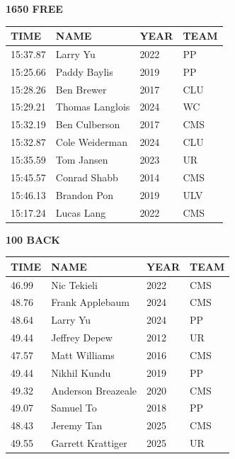 \begin{table}[H]
\centering
\begin{minipage}[t]{0.48\textwidth}
\centering
\textbf{1650 FREE}\\[0.1cm]
\begin{tabular}{@{}p{1.8cm}p{2.8cm}p{1.2cm}p{1.4cm}@{}}
\hline
    \textbf{TIME} & \textbf{NAME} & \textbf{YEAR} & \textbf{TEAM} \\
\hline
    15:37.87 & Larry Yu & 2022 & PP \\
    15:25.66 & Paddy Baylis & 2019 & PP \\
    15:28.26 & Ben Brewer & 2017 & CLU \\
    15:29.21 & Thomas Langlois & 2024 & WC \\
    15:32.19 & Ben Culberson & 2017 & CMS \\
    15:32.87 & Cole Weiderman & 2024 & CLU \\
    15:35.59 & Tom Jansen & 2023 & UR \\
    15:45.57 & Conrad Shabb & 2014 & CMS \\
    15:46.13 & Brandon Pon & 2019 & ULV \\
    15:17.24 & Lucas Lang & 2022 & CMS \\
\hline
\end{tabular}
\end{minipage}\hfill
\begin{minipage}[t]{0.48\textwidth}
\centering
\textbf{100 BACK}\\[0.1cm]
\begin{tabular}{@{}p{1.8cm}p{2.8cm}p{1.2cm}p{1.4cm}@{}}
\hline
    \textbf{TIME} & \textbf{NAME} & \textbf{YEAR} & \textbf{TEAM} \\
\hline
    46.99 & Nic Tekieli & 2022 & CMS \\
    48.76 & Frank Applebaum & 2024 & CMS \\
    48.64 & Larry Yu & 2024 & PP \\
    49.44 & Jeffrey Depew & 2012 & UR \\
    47.57 & Matt Williams & 2016 & CMS \\
    49.44 & Nikhil Kundu & 2019 & PP \\
    49.32 & Anderson Breazeale & 2020 & CMS \\
    49.07 & Samuel To & 2018 & PP \\
    48.43 & Jeremy Tan & 2025 & CMS \\
    49.55 & Garrett Krattiger & 2025 & UR \\
\hline
\end{tabular}
\end{minipage}
\end{table}

